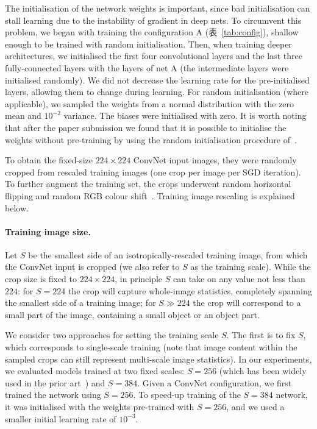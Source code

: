 \documentclass{article} %
\newcommand{\tblref}[1]{表~\ref{#1}}
\begin{document}
The initialisation of the network weights is important, since bad initialisation can stall learning due to the instability of gradient in deep nets.
To circumvent this problem, we began with training the configuration A (\tblref{tab:config}), shallow enough to be trained with random initialisation. Then, when training deeper
architectures, we initialised the first four convolutional layers and the last three fully-connected layers with the layers of net A (the intermediate layers were
initialised randomly). We did not decrease the learning rate for the pre-initialised layers, allowing them to change during learning.
For random initialisation (where applicable), we sampled the weights from a normal distribution with the zero mean and $10^{-2}$ variance. The biases were initialised with zero.
It is worth noting that after the paper submission we found that it is possible to initialise the weights without pre-training by using the random initialisation procedure of~\citet{Glorot10}.

To obtain the fixed-size $224 \times 224$ ConvNet input images, they were randomly cropped from rescaled training images (one crop per image per SGD iteration).
To further augment the training set, the crops underwent random horizontal flipping and random RGB colour shift~\citep{Krizhevsky12}. Training image rescaling is explained below.

\paragraph{Training image size.}
Let $S$ be the smallest side of an isotropically-rescaled training image, from which the ConvNet input is cropped (we also refer to $S$ as the training scale).
While the crop size is fixed to $224 \times 224$, in principle $S$ can take on any value not less than $224$: for $S=224$ the crop will capture whole-image statistics, completely spanning the smallest side of a training image;
for $S \gg 224$ the crop will correspond to a small part of the image, containing a small object or an object part.

We consider two approaches for setting the training scale $S$. 
The first is to fix $S$, which corresponds to single-scale training (note that image content within the sampled crops can still represent multi-scale image statistics).
In our experiments, we evaluated models trained at two fixed scales: $S=256$ (which has been widely used in the prior art~\citep{Krizhevsky12,Zeiler13,Sermanet14}) and $S=384$.
Given a \mbox{ConvNet} configuration, we first trained the network using $S=256$. 
To speed-up training of the $S=384$ network, it was initialised with the weights pre-trained with $S=256$, and we used a smaller initial learning rate of $10^{-3}$.
\end{document}

